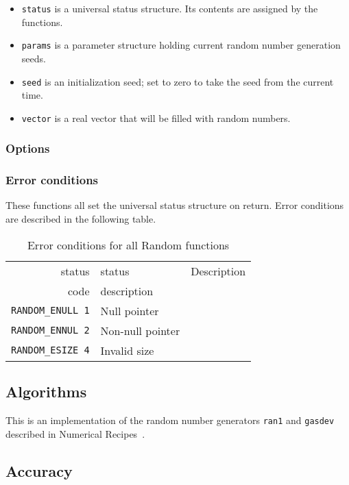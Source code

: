 \documentclass{article}
\begin{document}
\begin{itemize}
\item\verb+status+ is a universal status structure.  Its contents are
assigned by the functions.
\item\verb+params+ is a parameter structure holding current random number
generation seeds.
\item\verb+seed+ is an initialization seed; set to zero to take the seed from
the current time.
\item\verb+vector+ is a real vector that will be filled with random numbers.
\end{itemize}

\subsubsection{Options}

\subsubsection{Error conditions}

These functions all set the universal status structure on return.
Error conditions are described in the following table.

\begin{table}
\begin{tabular}{|r|l|p{2in}|}\hline
status  & status          & Description\\
code    & description     & \\\hline
\verb+RANDOM_ENULL 1+ & Null pointer & \\
\verb+RANDOM_ENNUL 2+ & Non-null pointer & \\
\verb+RANDOM_ESIZE 4+ & Invalid size & \\
\hline
\end{tabular}
\caption{Error conditions for all Random functions}\label{tbl:CV}
\end{table}

\subsection{Algorithms}

This is an implementation of the random number generators \verb+ran1+ and
\verb+gasdev+ described in Numerical Recipes~\cite{ptvf:1992}.

\subsection{Accuracy}
\end{document}
